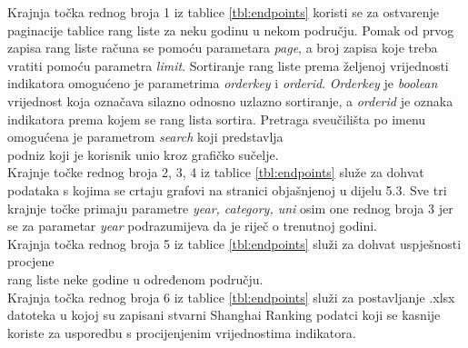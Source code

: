 \documentclass[times, utf8, zavrsni]{fer}
\begin{document}
        \FloatBarrier
Krajnja točka rednog broja 1 iz tablice \ref{tbl:endpoints} koristi se za ostvarenje paginacije tablice rang liste za neku godinu u nekom području.
Pomak od prvog zapisa rang liste računa se pomoću parametara \emph{page}, a broj zapisa koje treba vratiti pomoću parametra \emph{limit}.
Sortiranje rang liste prema željenoj vrijednosti indikatora omogućeno je parametrima \emph{orderkey} i \emph{orderid}.
\emph{Orderkey} je \emph{boolean} vrijednost koja označava silazno odnosno uzlazno sortiranje, a \emph{orderid} je oznaka indikatora
prema kojem se rang lista sortira. Pretraga sveučilišta po imenu omogućena je parametrom \emph{search} koji predstavlja \\podniz koji je korisnik unio 
kroz grafičko sučelje.
\\

Krajnje točke rednog broja 2, 3, 4 iz tablice \ref{tbl:endpoints} služe za dohvat podataka s kojima se crtaju grafovi na stranici objašnjenoj u 
dijelu 5.3. Sve tri krajnje točke primaju parametre \emph{year, category, uni} osim one rednog broja 3 jer se za parametar \emph{year} podrazumijeva 
da je riječ o trenutnoj godini.
\\

Krajnja točka rednog broja 5 iz tablice \ref{tbl:endpoints} služi za dohvat uspješnosti procjene \\rang liste neke godine u određenom području.
\\

Krajnja točka rednog broja 6 iz tablice \ref{tbl:endpoints} služi za postavljanje .xlsx datoteka u kojoj su zapisani stvarni Shanghai Ranking podatci 
koji se kasnije koriste za usporedbu s procijenjenim vrijednostima indikatora.
\end{document}
